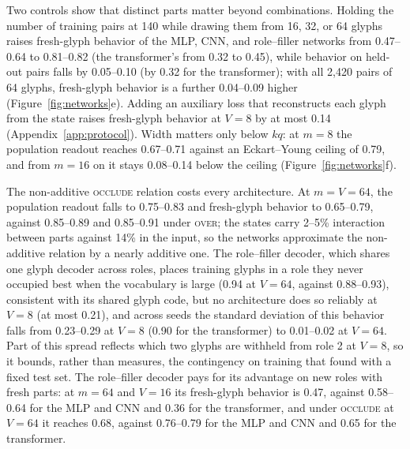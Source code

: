 \documentclass[10pt]{article}
\theoremstyle{plain}
\theoremstyle{remark}
\begin{document}
Two controls show that distinct parts matter beyond combinations. Holding the number of training pairs at 140 while drawing them from 16, 32, or 64 glyphs raises fresh-glyph behavior of the MLP, CNN, and role--filler networks from 0.47--0.64 to 0.81--0.82 (the transformer's from 0.32 to 0.45), while behavior on held-out pairs falls by 0.05--0.10 (by 0.32 for the transformer); with all 2{,}420 pairs of 64 glyphs, fresh-glyph behavior is a further 0.04--0.09 higher (Figure~\ref{fig:networks}e). Adding an auxiliary loss that reconstructs each glyph from the state raises fresh-glyph behavior at $V = 8$ by at most 0.14 (Appendix~\ref{app:protocol}). Width matters only below $kq$: at $m = 8$ the population readout reaches 0.67--0.71 against an Eckart--Young ceiling of 0.79, and from $m = 16$ on it stays 0.08--0.14 below the ceiling (Figure~\ref{fig:networks}f).

The non-additive \textsc{occlude} relation costs every architecture. At $m = V = 64$, the population readout falls to 0.75--0.83 and fresh-glyph behavior to 0.65--0.79, against 0.85--0.89 and 0.85--0.91 under \textsc{over}; the states carry 2--5\% interaction between parts against 14\% in the input, so the networks approximate the non-additive relation by a nearly additive one. The role--filler decoder, which shares one glyph decoder across roles, places training glyphs in a role they never occupied best when the vocabulary is large (0.94 at $V = 64$, against 0.88--0.93), consistent with its shared glyph code, but no architecture does so reliably at $V = 8$ (at most 0.21), and across seeds the standard deviation of this behavior falls from 0.23--0.29 at $V = 8$ (0.90 for the transformer) to 0.01--0.02 at $V = 64$. Part of this spread reflects which two glyphs are withheld from role 2 at $V = 8$, so it bounds, rather than measures, the contingency on training that \citet{mccoy2020berts} found with a fixed test set. The role--filler decoder pays for its advantage on new roles with fresh parts: at $m = 64$ and $V = 16$ its fresh-glyph behavior is 0.47, against 0.58--0.64 for the MLP and CNN and 0.36 for the transformer, and under \textsc{occlude} at $V = 64$ it reaches 0.68, against 0.76--0.79 for the MLP and CNN and 0.65 for the transformer.
\end{document}
